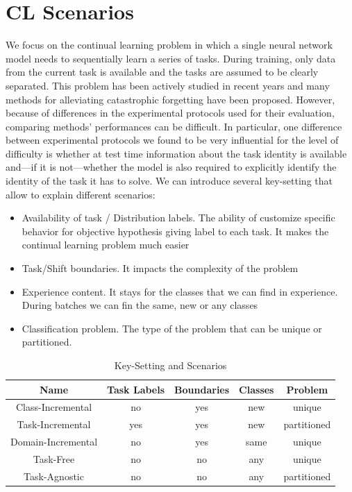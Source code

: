 \documentclass[english, LaM, oneside]{sapthesis}%
\begin{document}
\section{CL Scenarios}
We focus on the continual learning problem in which a single neural network model needs to sequentially learn a series of tasks. During training, only data from the current task is available and the tasks are assumed to be clearly separated. This problem has been actively studied in recent years and many methods for alleviating catastrophic forgetting have been proposed. However, because of differences in the experimental protocols used for their evaluation, comparing methods’ performances can be difficult. In particular, one difference between experimental protocols we found to be very influential for the level of difficulty is whether at test time information about the task identity is available and—if it is not—whether the model is also required to explicitly identify the identity of the task it has to solve.
We can introduce several key-setting that allow to explain different scenarios:
\begin{itemize}
\item Availability of task / Distribution labels. The ability of customize specific behavior for objective hypothesis giving label to each task. It makes the continual learning problem much easier
\item Task/Shift boundaries. It impacts the complexity of the problem
\item Experience content. It stays for the classes that we can find in experience. During batches we can fin the same, new or any classes
\item Classification problem. The type of the problem that can be unique or partitioned.
\end{itemize}



\begin{table}[h]
            \centering
            \begin{tabular}{ |c|c|c|c|c|  }
                \hline
                \textbf{Name} & \textbf{Task Labels} & \textbf{Boundaries} & \textbf{Classes} & \textbf{Problem}\\
                \hline \hline
                Class-Incremental & no & yes &  new & unique\\
                \hline
                Task-Incremental & yes & yes &  new & partitioned\\
                \hline
                Domain-Incremental & no & yes &  same & unique\\
                \hline
                Task-Free & no & no &  any & unique\\
                \hline
                Task-Agnostic & no & no &  any & partitioned\\
                
                
                \hline 
                
            \end{tabular}
            
            \caption{Key-Setting and Scenarios}
            \label{tab:vggrob}
        \end{table}
\end{document}
